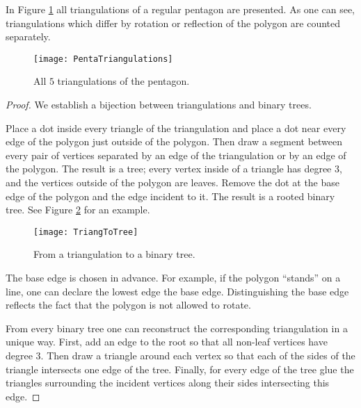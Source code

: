 \begin{page}

In Figure \ref{fig:PentaTriangulations} all triangulations of a regular pentagon are presented.
As one can see, triangulations which differ by rotation or reflection of the polygon are counted separately.

\begin{figure}[ht]
\begin{center}
\texttt{[image: PentaTriangulations]}
\end{center}
\caption{All $5$ triangulations of the pentagon.}
\label{fig:PentaTriangulations}
\end{figure}


\begin{proof}
We establish a bijection between triangulations and binary trees.

Place a dot inside every triangle of the triangulation and place a dot near every edge of the polygon just outside of the polygon.
Then draw a segment between every pair of vertices separated by an edge of the triangulation or by an edge of the polygon.
The result is a tree; every vertex inside of a triangle has degree $3$, and the vertices outside of the polygon are leaves.
Remove the dot at the base edge of the polygon and the edge incident to it.
The result is a rooted binary tree.
See Figure \ref{fig:TriangToTree} for an example.

\begin{figure}[ht]
\begin{center}
\texttt{[image: TriangToTree]}
\end{center}
\caption{From a triangulation to a binary tree.}
\label{fig:TriangToTree}
\end{figure}

The base edge is chosen in advance.
For example, if the polygon ``stands'' on a line, one can declare the lowest edge the base edge.
Distinguishing the base edge reflects the fact that the polygon is not allowed to rotate.

From every binary tree one can reconstruct the corresponding triangulation in a unique way.
First, add an edge to the root so that all non-leaf vertices have degree $3$.
Then draw a triangle around each vertex so that each of the sides of the triangle intersects one edge of the tree.
Finally, for every edge of the tree glue the triangles surrounding the incident vertices along their sides intersecting this edge.
\end{proof}




\end{page}

